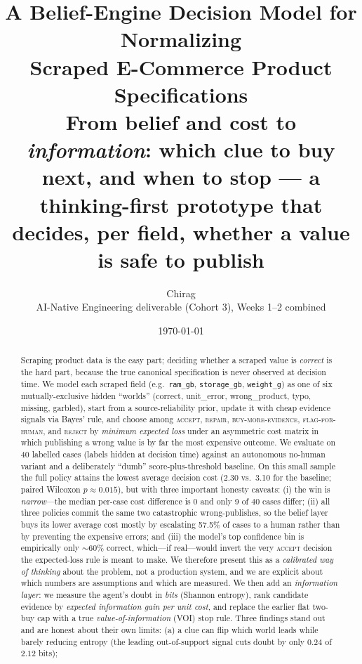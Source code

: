 \documentclass[11pt]{article}
\title{\textbf{A Belief-Engine Decision Model for Normalizing\\
Scraped E-Commerce Product Specifications}\\[4pt]
\large From belief and cost to \emph{information}: which clue to buy next, and when
to stop --- a thinking-first prototype that decides, per field, whether a value is
safe to publish}
\author{Chirag \\ \small AI-Native Engineering deliverable (Cohort 3), Weeks 1--2 combined}
\date{\today}
\begin{document}
\maketitle

\begin{abstract}
\noindent
Scraping product data is the easy part; deciding whether a scraped value is
\emph{correct} is the hard part, because the true canonical specification is never
observed at decision time. We model each scraped field (e.g.\ \texttt{ram\_gb},
\texttt{storage\_gb}, \texttt{weight\_g}) as one of six mutually-exclusive hidden
``worlds'' (\textsf{correct}, \textsf{unit\_error}, \textsf{wrong\_product},
\textsf{typo}, \textsf{missing}, \textsf{garbled}), start from a source-reliability
prior, update it with cheap evidence signals via Bayes' rule, and choose among
\textsc{accept}, \textsc{repair}, \textsc{buy-more-evidence},
\textsc{flag-for-human}, and \textsc{reject} by \emph{minimum expected loss} under an
asymmetric cost matrix in which publishing a wrong value is by far the most
expensive outcome. We evaluate on 40 labelled cases (labels hidden at decision time)
against an autonomous no-human variant and a deliberately ``dumb'' score-plus-threshold
baseline. On this small sample the full policy attains the lowest average decision
cost (2.30 vs.\ 3.10 for the baseline; paired Wilcoxon $p\approx0.015$), but with
three important honesty caveats: (i) the win is \emph{narrow}---the median per-case
cost difference is $0$ and only 9 of 40 cases differ; (ii) all three policies commit
the same two catastrophic wrong-publishes, so the belief layer buys its lower average
cost mostly by escalating 57.5\% of cases to a human rather than by preventing the
expensive errors; and (iii) the model's top confidence bin is empirically only
$\sim$60\% correct, which---if real---would invert the very
\textsc{accept} decision the expected-loss rule is meant to make. We therefore
present this as a \emph{calibrated way of thinking} about the problem, not a
production system, and we are explicit about which numbers are assumptions and which
are measured. We then add an \emph{information layer}: we measure the agent's doubt in
\emph{bits} (Shannon entropy), rank candidate evidence by \emph{expected information
gain per unit cost}, and replace the earlier flat two-buy cap with a true
\emph{value-of-information} (VOI) stop rule. Three findings stand out and are honest
about their own limits: (a) a clue can flip which world leads while barely reducing
entropy (the leading out-of-support signal cuts doubt by only $0.24$ of $2.12$ bits);

\end{abstract}
\end{document}
